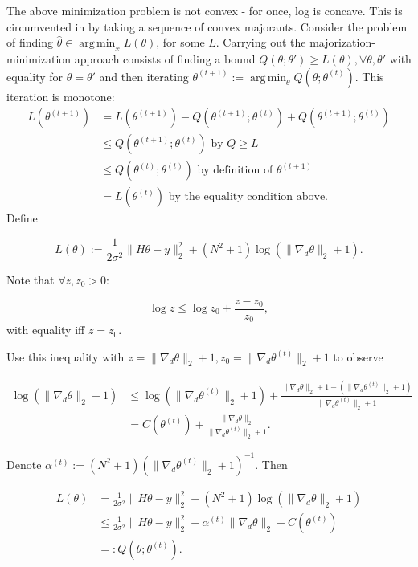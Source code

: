 \documentclass[paper=a4, fontsize=11pt]{scrartcl} %
\DeclareMathOperator*{\argmin}{arg\,min}
\numberwithin{equation}{section} %
\numberwithin{figure}{section} %
\numberwithin{table}{section} %
\newcommand{\grad}{\nabla_{d} }
\begin{document}
The above minimization problem is not convex - for once, log is concave.
This is circumvented in \cite{oliveira2009adaptive} by taking a sequence of convex majorants. 
Consider the problem of finding $\hat{\theta} \in \argmin_{x} L(\theta)$, for some $L$. Carrying out the majorization-minimization 
approach consists of finding a bound $Q(\theta; \theta') \geq L(\theta), \forall \theta,\theta'$
with equality for $\theta=\theta'$
and then iterating $\theta^{(t+1)} := \argmin_{\theta} Q(\theta;\theta^{(t)})$. This iteration is monotone:
\begin{align*}
  L(\theta^{(t+1)}) &= L(\theta^{(t+1)}) - Q(\theta^{(t+1)}; \theta^{(t)}) + Q(\theta^{(t+1)}; \theta^{(t)})\\
  &\leq  Q(\theta^{(t+1)}; \theta^{(t)}) \text{ by } Q \geq L \\
  & \leq Q(\theta^{(t)} ;\theta^{(t)}) \text{ by definition of } \theta^{(t+1)} \\
  &= L(\theta^{(t)}) \text{ by the equality condition above. }
\end{align*}
Define 

$$
L(\theta) :=\frac{1}{2\sigma^2} \|H\theta - y\|_2^2 + (N^2 + 1) \log (\|\grad\theta\|_2 + 1).
$$

Note that $\forall z,z_0 > 0$:

$$
\log z \leq \log z_0 + \frac{z-z_0}{z_0},
$$ 
with equality iff $z = z_0$.

Use this inequality with $z = \|\grad\theta\|_2 + 1, z_0 = \|\grad
\theta^{(t)}\|_2 + 1$ to observe

\begin{align*}
  \log (\|\grad\theta\|_2 + 1) &\leq \log( \|\grad \theta^{(t)}\|_2 + 1 ) + 
  \frac{ \|\grad \theta\|_2 + 1 - (\|\grad \theta^{(t)}\|_2 + 1)}{\|\grad \theta^{(t)}\|_2 + 1} \\
  &= C(\theta^{(t)}) + \frac{ \|\grad \theta\|_2 }{\|\grad \theta^{(t)}\|_2 + 1}.
\end{align*}

Denote $\alpha^{(t)} := (N^2+1)( \|\grad\theta^{(t)} \|_2 + 1 )^{-1}$. Then

\begin{align*}
  L(\theta) &= \frac{1}{2\sigma^2} \|H\theta - y\|_2^2 + (N^2 + 1) \log (\|\grad\theta\|_2 + 1) \\ 
  &\leq \frac{1}{2\sigma^2} \|H\theta - y\|_2^2 + \alpha^{(t)} \|\grad \theta\|_2   + C(\theta^{(t)})\\
  &=: Q(\theta ; \theta^{(t)}).
\end{align*}
\end{document}
